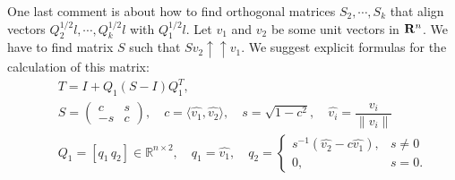 One last comment is about how to find orthogonal matrices $S_2,\cdots,S_k$
that align vectors $Q_2^{1/2}l, \cdots, Q_k^{1/2}l$ with $Q_1^{1/2}l$.
Let $v_1$ and $v_2$ be some unit vectors in ${\bf R}^n$.
We have to find matrix $S$ such that $Sv_2\uparrow\uparrow v_1$.
We suggest explicit formulas for the calculation of this matrix:
\begin{eqnarray}
&&T = I + Q_1(S - I)Q_1^T,\\ \label{valign1}
&& S = \begin{pmatrix}
     c & s\\
     -s & c
    \end{pmatrix},\quad c = \langle\hat{v_1}, \hat{v_2}\rangle,\quad s = \sqrt{1 - c^2},\quad \hat{v_i} = \dfrac{v_i}{\|v_i\|}\\ \label{valign2}
&&  Q_1 = [q_1 \,q_2]\in \mathbb{R}^{n\times2},\quad q_1 = \hat{v_1}, \quad
q_2 = \begin{cases}
s^{-1}(\hat{v_2} - c\hat{v_1}),& s\ne 0\\
0,& s = 0.
\end{cases} \label{valign3}
\end{eqnarray}



